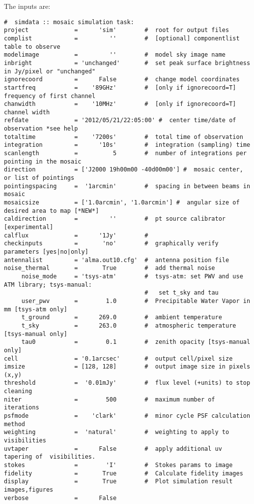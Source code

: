 The inputs are:
\small
\begin{verbatim}
#  simdata :: mosaic simulation task:
project             =      'sim'        #  root for output files
complist            =         ''        #  [optional] componentlist table to observe
modelimage          =         ''        #  model sky image name
inbright            = 'unchanged'       #  set peak surface brightness in Jy/pixel or "unchanged"
ignorecoord         =      False        #  change model coordinates
startfreq           =    '89GHz'        #  [only if ignorecoord=T] frequency of first channel
chanwidth           =    '10MHz'        #  [only if ignorecoord=T] channel width
refdate             = '2012/05/21/22:05:00' #  center time/date of observation *see help
totaltime           =    '7200s'        #  total time of observation
integration         =      '10s'        #  integration (sampling) time
scanlength          =          5        #  number of integrations per pointing in the mosaic
direction           = ['J2000 19h00m00 -40d00m00'] #  mosaic center, or list of pointings
pointingspacing     =  '1arcmin'        #  spacing in between beams in mosaic
mosaicsize          = ['1.0arcmin', '1.0arcmin'] #  angular size of desired area to map [*NEW*]
caldirection        =         ''        #  pt source calibrator [experimental]
calflux             =      '1Jy'        #
checkinputs         =       'no'        #  graphically verify parameters [yes|no|only]
antennalist         = 'alma.out10.cfg'  #  antenna position file
noise_thermal       =       True        #  add thermal noise
     noise_mode     = 'tsys-atm'        #  tsys-atm: set PWV and use ATM library; tsys-manual:
                                        #   set t_sky and tau
     user_pwv       =        1.0        #  Precipitable Water Vapor in mm [tsys-atm only]
     t_ground       =      269.0        #  ambient temperature
     t_sky          =      263.0        #  atmospheric temperature [tsys-manual only]
     tau0           =        0.1        #  zenith opacity [tsys-manual only]
cell                = '0.1arcsec'       #  output cell/pixel size
imsize              = [128, 128]        #  output image size in pixels (x,y)
threshold           =  '0.01mJy'        #  flux level (+units) to stop cleaning
niter               =        500        #  maximum number of iterations
psfmode             =    'clark'        #  minor cycle PSF calculation method
weighting           =  'natural'        #  weighting to apply to visibilities
uvtaper             =      False        #  apply additional uv tapering of  visibilities.
stokes              =        'I'        #  Stokes params to image
fidelity            =       True        #  Calculate fidelity images
display             =       True        #  Plot simulation result images,figures
verbose             =      False        
\end{verbatim}
\normalsize

